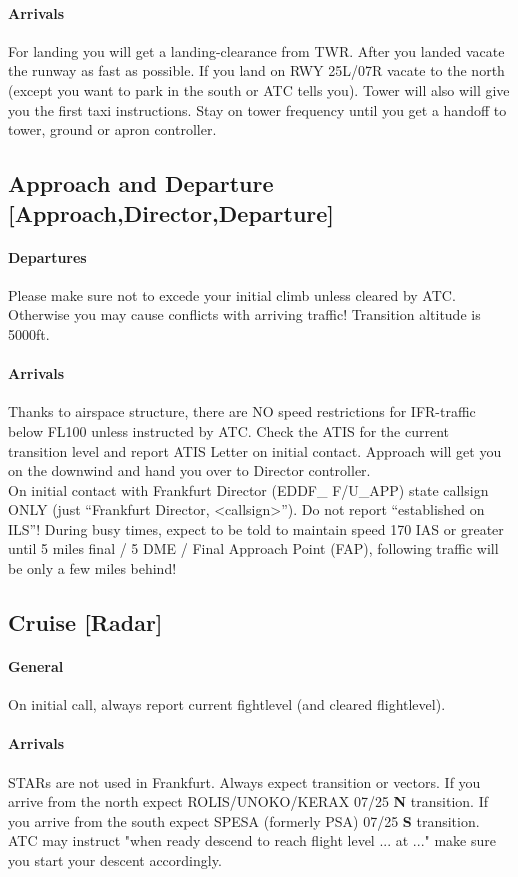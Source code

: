 \paragraph{Arrivals}
For landing you will get a landing-clearance from TWR.
After you landed vacate the runway as fast as possible.
If you land on RWY 25L/07R vacate to the north (except you want to park in the south or ATC tells you).
Tower will also will give you the first taxi instructions.
Stay on tower frequency until you get a handoff to tower, ground or apron controller.

\subsection[APP]{Approach and Departure [Approach,Director,Departure]}
\paragraph{Departures}
Please make sure not to excede your initial climb unless cleared by ATC.
Otherwise you may cause conflicts with arriving traffic!
Transition altitude is 5000ft.

\paragraph{Arrivals}
Thanks to airspace structure, there are NO speed restrictions for IFR-traffic below FL100 unless
instructed by ATC.
Check the ATIS for the current transition level and report ATIS Letter on initial contact.
Approach will get you on the downwind and hand you over to Director controller.\\
On initial contact with Frankfurt Director (EDDF\_ F/U\_APP) state callsign ONLY (just “Frankfurt Director, <callsign>”).
Do not report “established on ILS”! During busy times, expect to be told to maintain speed 170 IAS or greater until 5 miles final / 5 DME / Final Approach Point (FAP), following traffic will be only a few miles behind!

\subsection[CTR]{Cruise [Radar]}
\paragraph{General}
On initial call, always report current fightlevel (and cleared flightlevel).

\paragraph{Arrivals}
STARs are not used in Frankfurt. Always expect transition or vectors.
If you arrive from the north expect ROLIS/UNOKO/KERAX 07/25 \textbf{N} transition.
If you arrive from the south expect SPESA (formerly PSA) 07/25 \textbf{S} transition.
ATC may instruct "when ready descend to reach flight level ... at ..." make sure you start your descent accordingly.
